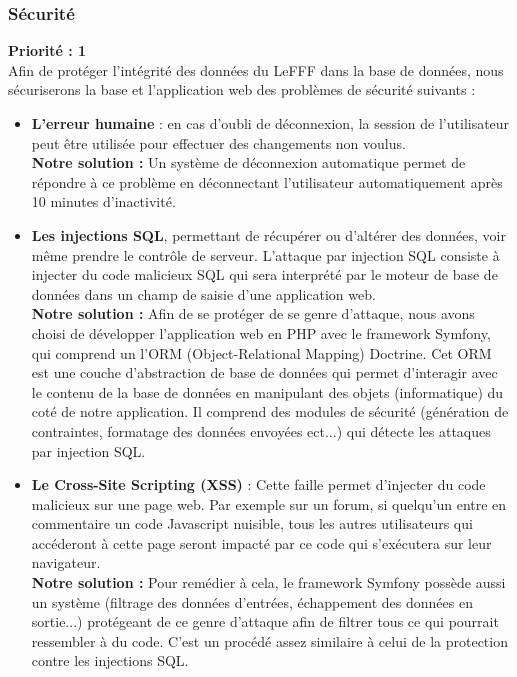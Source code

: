 \documentclass[12pt,a4paper]{article}
\begin{document}
\subsubsection{Sécurité}
\textbf{Priorité : 1} \\
Afin de protéger l'intégrité des données du LeFFF dans la base de données, nous sécuriserons la base et l'application web des problèmes de sécurité suivants :
\begin{itemize}
    \item \textbf{L'erreur humaine} : en cas d'oubli de déconnexion, la session de l'utilisateur peut être utilisée pour effectuer des changements non voulus. \\
    \textbf{Notre solution :} Un système de déconnexion automatique permet de répondre à ce problème en déconnectant l'utilisateur automatiquement après 10 minutes d'inactivité.

    \item \textbf{Les injections SQL}, permettant de récupérer ou d'altérer des données, voir même prendre le contrôle de serveur. L'attaque par injection SQL consiste à injecter du code malicieux SQL qui sera interprété par le moteur de base de données dans un champ de saisie d'une application web. \\
    \textbf{Notre solution :} Afin de se protéger de se genre d'attaque, nous avons choisi de développer l'application web en PHP avec le framework Symfony, qui comprend un l'ORM (Object-Relational Mapping) Doctrine. Cet ORM est une couche d'abstraction de base de données qui permet d'interagir avec le contenu de la base de données en manipulant des objets (informatique) du coté de notre application. Il comprend des modules de sécurité (génération de contraintes, formatage des données envoyées ect...) qui détecte les attaques par injection SQL.

    \item \textbf{Le Cross-Site Scripting (XSS)} : Cette faille permet d'injecter du code malicieux sur une page web. Par exemple sur un forum, si quelqu'un entre en commentaire un code Javascript nuisible, tous les autres utilisateurs qui accéderont à cette page seront impacté par ce code qui s'exécutera sur leur navigateur. \\
    \textbf{Notre solution :} Pour remédier à cela, le framework Symfony possède aussi un système (filtrage des données d'entrées, échappement des données en sortie...) protégeant de ce genre d'attaque afin de filtrer tous ce qui pourrait ressembler à du code. C'est un procédé assez similaire à celui de la protection contre les injections SQL.


\end{itemize}
\end{document}
